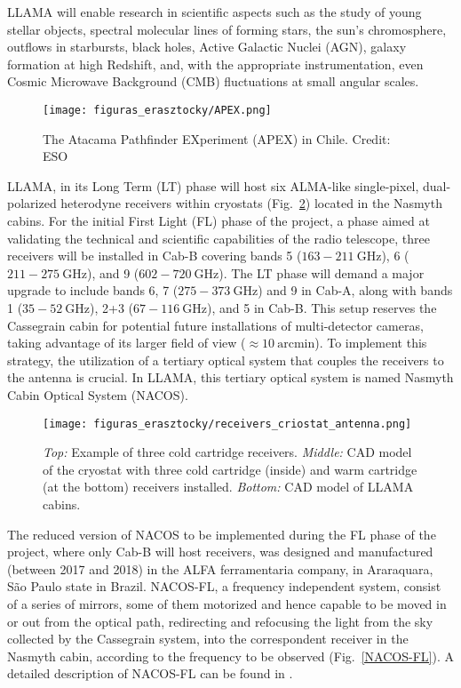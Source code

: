 \documentclass[baaa]{baaa}
\begin{document}
LLAMA will enable research in scientific aspects such as the study of young stellar objects, spectral molecular lines of forming stars, the sun's chromosphere, outflows in starbursts, black holes, Active Galactic Nuclei (AGN), galaxy formation at high Redshift, and, with the appropriate instrumentation, even Cosmic Microwave Background (CMB) fluctuations at small angular scales.

\begin{figure}[!t]
\centering
\texttt{[image: figuras\_erasztocky/APEX.png]}
\caption{The Atacama Pathfinder EXperiment (APEX)
in Chile. Credit: ESO}
\label{APEX}
\end{figure}

LLAMA, in its Long Term (LT) phase will host six ALMA-like single-pixel, dual-polarized heterodyne receivers \citep{carter2004alma} within cryostats (Fig.~\ref{receivers_criostat_antenna}) located in the Nasmyth cabins. For the initial First Light (FL) phase of the project, a phase aimed at validating the technical and scientific capabilities of the radio telescope, three receivers will be installed in Cab-B covering bands 5 ($163-211~\mathrm{GHz}$), 6 ($211-275~\mathrm{GHz}$), and 9 ($602-720~\mathrm{GHz}$). The LT phase will demand a major upgrade to include bands 6, 7 ($275-373~\mathrm{GHz}$) and 9 in Cab-A, along with bands 1 ($35-52~\mathrm{GHz}$), 2+3 ($67-116~\mathrm{GHz}$), and 5 in Cab-B. This setup reserves the Cassegrain cabin for potential future installations of multi-detector cameras, taking advantage of its larger field of view ($\approx10~\mathrm{arcmin}$). To implement this strategy, the utilization of a tertiary optical system that couples the receivers to the antenna is crucial. In LLAMA, this tertiary optical system is named Nasmyth Cabin Optical System (NACOS). 

\begin{figure}[!t]
\centering
\texttt{[image: figuras\_erasztocky/receivers\_criostat\_antenna.png]}
\caption{\emph{Top:} Example of three cold cartridge receivers. \emph{Middle:} CAD model of the cryostat with three cold cartridge (inside) and warm cartridge (at the bottom) receivers installed. \emph{Bottom:} CAD model of LLAMA cabins.}
\label{receivers_criostat_antenna}
\end{figure}

The reduced version of NACOS to be implemented during the FL phase of the project, where only Cab-B will host receivers, was designed and manufactured (between 2017 and 2018) in the ALFA ferramentaria company, in Araraquara, São Paulo state in Brazil.
NACOS-FL, a frequency independent system, consist of a series of mirrors, some of them motorized and hence capable to be moved in or out from the optical path, redirecting and refocusing the light from the sky collected by the Cassegrain system, into the correspondent receiver in the Nasmyth cabin, according to the frequency to be observed (Fig.~\ref{NACOS-FL}). A detailed description of NACOS-FL can be found in \citep{rasztocky2024}.
\end{document}

